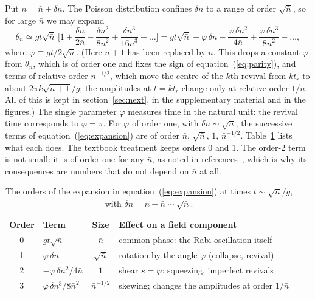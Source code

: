 \documentclass{iopjournal}
\newcommand{\nbar}{\bar{n}}
\begin{document}
Put $n = \nbar + \delta n$. The Poisson distribution confines $\delta n$ to a range of order $\sqrt{\nbar}$, so for large $\nbar$ we may expand
\begin{equation}
\theta_n \simeq gt\sqrt{\nbar}\,\Big[1 + \frac{\delta n}{2\nbar} - \frac{\delta n^2}{8\nbar^2} + \frac{\delta n^3}{16\nbar^3} - \dots\Big]
= gt\sqrt{\nbar} + \varphi\,\delta n - \frac{\varphi\,\delta n^2}{4\nbar} + \frac{\varphi\,\delta n^3}{8\nbar^2} - \dots,
\label{eq:expansion}
\end{equation}
where $\varphi \equiv gt/2\sqrt{\nbar}$. (Here $n+1$ has been replaced by $n$. This drops a constant $\varphi$ from $\theta_n$, which is of order one and fixes the sign of equation~(\ref{eq:parity}), and terms of relative order $\nbar^{-1/2}$, which move the centre of the $k$th revival from $kt_r$ to about $2\pi k\sqrt{\nbar+1}/g$; the amplitudes at $t = kt_r$ change only at relative order $1/\nbar$. All of this is kept in section~\ref{sec:next}, in the supplementary material and in the figures.) The single parameter $\varphi$ measures time in the natural unit: the revival time corresponds to $\varphi = \pi$. For $\varphi$ of order one, with $\delta n \sim \sqrt{\nbar}$, the successive terms of equation~(\ref{eq:expansion}) are of order $\nbar$, $\sqrt{\nbar}$, $1$, $\nbar^{-1/2}$. Table~\ref{tab:orders} lists what each does. The textbook treatment keeps orders 0 and 1. The order-2 term is not small: it is of order one for any $\nbar$, as noted in references~\cite{gea-banacloche1991, auffeves2003}, which is why its consequences are numbers that do not depend on $\nbar$ at all.

\begin{table}
\centering
\caption{The orders of the expansion in equation~(\ref{eq:expansion}) at times $t \sim \sqrt{\nbar}/g$, with $\delta n = n - \nbar \sim \sqrt{\nbar}$.}
\begin{tabular}{clcl}
\hline
Order & Term & Size & Effect on a field component \\
\hline
0 & $gt\sqrt{\nbar}$ & $\nbar$ & common phase: the Rabi oscillation itself \\
1 & $\varphi\,\delta n$ & $\sqrt{\nbar}$ & rotation by the angle $\varphi$ (collapse, revival) \\
2 & $-\varphi\,\delta n^2/4\nbar$ & $1$ & shear $s = \varphi$: squeezing, imperfect revivals \\
3 & $\varphi\,\delta n^3/8\nbar^2$ & $\nbar^{-1/2}$ & skewing; changes the amplitudes at order $1/\nbar$ \\
\hline
\end{tabular}
\label{tab:orders}
\end{table}
\end{document}

